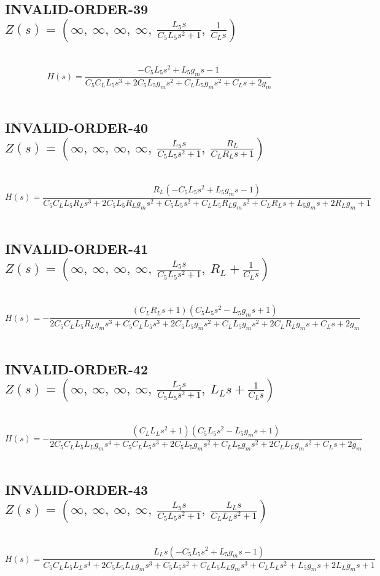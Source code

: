 \documentclass{article}
\begin{document}
\subsection{INVALID-ORDER-39 $Z(s) = \left( \infty, \  \infty, \  \infty, \  \infty, \  \frac{L_{5} s}{C_{5} L_{5} s^{2} + 1}, \  \frac{1}{C_{L} s}\right)$ } \ 
\textbf{\[H(s) = \frac{- C_{5} L_{5} s^{2} + L_{5} g_{m} s - 1}{C_{5} C_{L} L_{5} s^{3} + 2 C_{5} L_{5} g_{m} s^{2} + C_{L} L_{5} g_{m} s^{2} + C_{L} s + 2 g_{m}}\] } \ 
\subsection{INVALID-ORDER-40 $Z(s) = \left( \infty, \  \infty, \  \infty, \  \infty, \  \frac{L_{5} s}{C_{5} L_{5} s^{2} + 1}, \  \frac{R_{L}}{C_{L} R_{L} s + 1}\right)$ } \ 
\textbf{\[H(s) = \frac{R_{L} \left(- C_{5} L_{5} s^{2} + L_{5} g_{m} s - 1\right)}{C_{5} C_{L} L_{5} R_{L} s^{3} + 2 C_{5} L_{5} R_{L} g_{m} s^{2} + C_{5} L_{5} s^{2} + C_{L} L_{5} R_{L} g_{m} s^{2} + C_{L} R_{L} s + L_{5} g_{m} s + 2 R_{L} g_{m} + 1}\] } \ 
\subsection{INVALID-ORDER-41 $Z(s) = \left( \infty, \  \infty, \  \infty, \  \infty, \  \frac{L_{5} s}{C_{5} L_{5} s^{2} + 1}, \  R_{L} + \frac{1}{C_{L} s}\right)$ } \ 
\textbf{\[H(s) = - \frac{\left(C_{L} R_{L} s + 1\right) \left(C_{5} L_{5} s^{2} - L_{5} g_{m} s + 1\right)}{2 C_{5} C_{L} L_{5} R_{L} g_{m} s^{3} + C_{5} C_{L} L_{5} s^{3} + 2 C_{5} L_{5} g_{m} s^{2} + C_{L} L_{5} g_{m} s^{2} + 2 C_{L} R_{L} g_{m} s + C_{L} s + 2 g_{m}}\] } \ 
\subsection{INVALID-ORDER-42 $Z(s) = \left( \infty, \  \infty, \  \infty, \  \infty, \  \frac{L_{5} s}{C_{5} L_{5} s^{2} + 1}, \  L_{L} s + \frac{1}{C_{L} s}\right)$ } \ 
\textbf{\[H(s) = - \frac{\left(C_{L} L_{L} s^{2} + 1\right) \left(C_{5} L_{5} s^{2} - L_{5} g_{m} s + 1\right)}{2 C_{5} C_{L} L_{5} L_{L} g_{m} s^{4} + C_{5} C_{L} L_{5} s^{3} + 2 C_{5} L_{5} g_{m} s^{2} + C_{L} L_{5} g_{m} s^{2} + 2 C_{L} L_{L} g_{m} s^{2} + C_{L} s + 2 g_{m}}\] } \ 
\subsection{INVALID-ORDER-43 $Z(s) = \left( \infty, \  \infty, \  \infty, \  \infty, \  \frac{L_{5} s}{C_{5} L_{5} s^{2} + 1}, \  \frac{L_{L} s}{C_{L} L_{L} s^{2} + 1}\right)$ } \ 
\textbf{\[H(s) = \frac{L_{L} s \left(- C_{5} L_{5} s^{2} + L_{5} g_{m} s - 1\right)}{C_{5} C_{L} L_{5} L_{L} s^{4} + 2 C_{5} L_{5} L_{L} g_{m} s^{3} + C_{5} L_{5} s^{2} + C_{L} L_{5} L_{L} g_{m} s^{3} + C_{L} L_{L} s^{2} + L_{5} g_{m} s + 2 L_{L} g_{m} s + 1}\] } \ 
\end{document}
